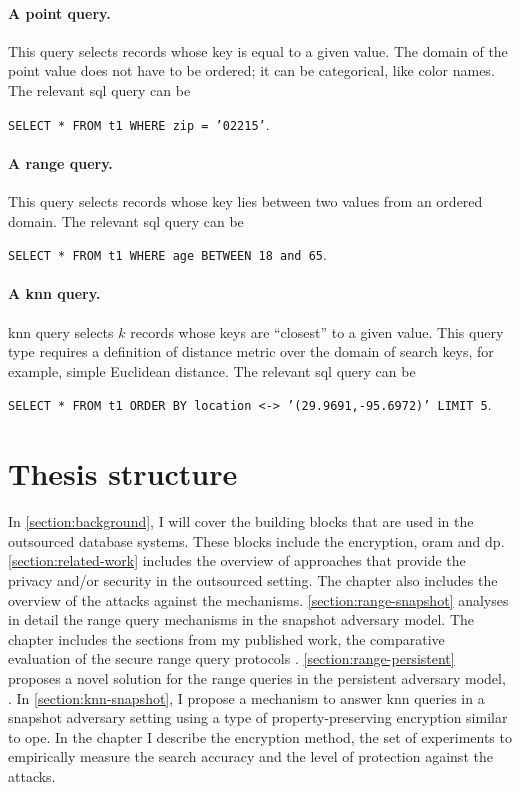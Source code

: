 			\paragraph*{A point query.}
				This query selects records whose key is equal to a given value.
				The domain of the point value does not have to be ordered; it can be categorical, like color names.
				The relevant \acrshort{sql} query can be

				\texttt{SELECT * FROM t1 WHERE zip = '02215'}.

			\paragraph*{A range query.}
				This query selects records whose key lies between two values from an ordered domain.
				The relevant \acrshort{sql} query can be

				\texttt{SELECT * FROM t1 WHERE age BETWEEN 18 and 65}.

			\paragraph*{A \acrshort{knn} query.}
				\acrlong{knn} query selects $k$ records whose keys are ``closest'' to a given value.
				This query type requires a definition of distance metric over the domain of search keys, for example, simple Euclidean distance.
				The relevant \acrshort{sql} query can be

				\texttt{SELECT * FROM t1 ORDER BY location <-> '(29.9691,-95.6972)' LIMIT 5}. %

	\section{Thesis structure}

		In \cref{section:background}, I will cover the building blocks that are used in the outsourced database systems.
		These blocks include the encryption, \acrshort{oram} and \acrlong{dp}.
		\cref{section:related-work} includes the overview of approaches that provide the privacy and/or security in the outsourced setting.
		The chapter also includes the overview of the attacks against the mechanisms.
		\cref{section:range-snapshot} analyses in detail the range query mechanisms in the snapshot adversary model.
		The chapter includes the sections from my published work, the comparative evaluation of the secure range query protocols \cite{ore-benchmark-17}.
		\cref{section:range-persistent} proposes a novel solution for the range queries in the persistent adversary model, \epsolute{} \cite{ore-benchmark-17}.
		In \cref{section:knn-snapshot}, I propose a mechanism to answer \acrlong{knn} queries in a snapshot adversary setting using a type of property-preserving encryption similar to \acrshort{ope}.
		In the chapter I describe the encryption method, the set of experiments to empirically measure the search accuracy and the level of protection against the attacks.

